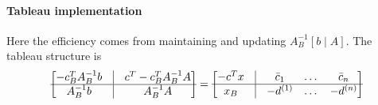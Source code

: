 \documentclass{article}
\begin{document}
\paragraph{Tableau implementation} Here the efficiency comes from maintaining and updating $A_B^{-1}[b \mid A]$. The tableau structure is
\begin{align*}
    \begin{bmatrix}
        -c_B^TA_B^{-1}b & \vline& c^T - c_B^TA_B^{-1}A\\
        \hline
        A_B^{-1}b & \vline & A_B^{-1}A
    \end{bmatrix} = \begin{bmatrix}
        -c^Tx & \vline& \bar c_1 & \dots & \bar c_n\\
        \hline
        x_B & \vline & -d^{(1)} & \dots & -d^{(n)}\\
    \end{bmatrix}
\end{align*}
\end{document}
